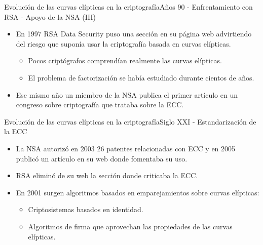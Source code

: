 \documentclass[spanish]{beamer}
\begin{document}
\begin{frame}[fragile]{Evolución de las curvas elípticas en la criptografía}{Años 90 - Enfrentamiento con RSA - Apoyo de la NSA (III)}
    \begin{itemize}
    \item En 1997 RSA Data Security puso una sección en su página web advirtiendo del riesgo que suponía usar la criptografía basada en curvas elípticas.
    \begin{itemize}
        \item Pocos criptógrafos comprendían realmente las curvas elípticas.
	    \item El problema de factorización se había estudiado durante cientos de años.
\end{itemize}
    \item Ese mismo año un miembro de la NSA publica
    el primer artículo en un congreso sobre criptografía que trataba sobre la ECC.
  \end{itemize}
\end{frame}

 \begin{frame}[fragile]{Evolución de las curvas elípticas en la criptografía}{Siglo XXI - Estandarización de la ECC}
    \begin{itemize}
    \item La NSA autorizó en 2003 26 patentes relacionadas
con ECC y en 2005 publicó un artículo en su web donde fomentaba su uso.
    \item RSA eliminó de su web la sección donde criticaba la ECC.
    \item En 2001 surgen algoritmos basados en emparejamientos sobre curvas elípticas: %
    \begin{itemize}
	    \item Criptosistemas basados en identidad.
	    \item Algoritmos de firma que aprovechan las propiedades de las curvas elípticas.
    \end{itemize}
  \end{itemize}
\end{frame}
\end{document}

